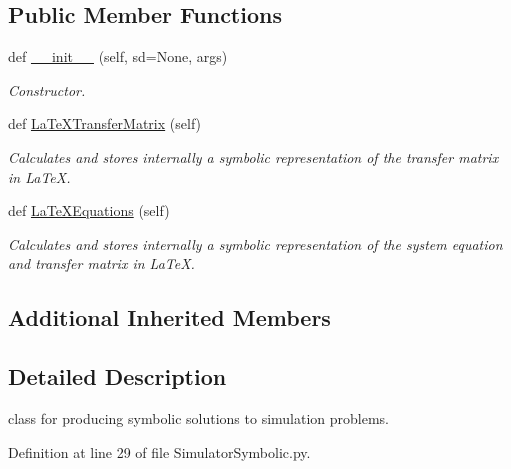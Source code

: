 \subsection*{Public Member Functions}
\begin{DoxyCompactItemize}
\item 
def \hyperlink{classSignalIntegrity_1_1SystemDescriptions_1_1SimulatorSymbolic_1_1SimulatorSymbolic_a72fa31992e716f60779f561f6cdbb4ce}{\+\_\+\+\_\+init\+\_\+\+\_\+} (self, sd=None, args)
\begin{DoxyCompactList}\small\item\em Constructor. \end{DoxyCompactList}\item 
def \hyperlink{classSignalIntegrity_1_1SystemDescriptions_1_1SimulatorSymbolic_1_1SimulatorSymbolic_adc83c150e43916083e3379cd4b9bb80e}{La\+Te\+X\+Transfer\+Matrix} (self)
\begin{DoxyCompactList}\small\item\em Calculates and stores internally a symbolic representation of the transfer matrix in La\+TeX. \end{DoxyCompactList}\item 
def \hyperlink{classSignalIntegrity_1_1SystemDescriptions_1_1SimulatorSymbolic_1_1SimulatorSymbolic_a3f6cd3290ceb07e8985e1eb832be3934}{La\+Te\+X\+Equations} (self)
\begin{DoxyCompactList}\small\item\em Calculates and stores internally a symbolic representation of the system equation and transfer matrix in La\+TeX. \end{DoxyCompactList}\end{DoxyCompactItemize}
\subsection*{Additional Inherited Members}


\subsection{Detailed Description}
class for producing symbolic solutions to simulation problems. 



Definition at line 29 of file Simulator\+Symbolic.\+py.



